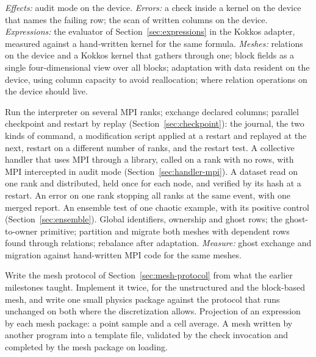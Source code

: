 \documentclass[11pt,a4paper]{article}
\begin{document}
\begin{description}[style=nextline,leftmargin=2em]
        \emph{Effects:} audit mode on the device.
        \emph{Errors:} a check inside a kernel on the device that names
        the failing row; the scan of written columns on the device.
        \emph{Expressions:} the evaluator of
        Section~\ref{sec:expressions} in the Kokkos adapter, measured
        against a hand-written kernel for the same formula.
        \emph{Meshes:} relations on the device and a Kokkos kernel that
        gathers through one; block fields as a single four-dimensional view
        over all blocks; adaptation with data resident on the device, using
        column capacity to avoid reallocation; where relation operations on
        the device should live.
  \item[M6. Distribution.]
        Run the interpreter on several MPI ranks; exchange declared columns;
        parallel checkpoint and restart by replay
        (Section~\ref{sec:checkpoint}): the journal, the two kinds of
        command, a modification script applied at a restart and replayed at
        the next, restart on a different number of ranks, and the restart
        test.  A collective handler that uses MPI through a library, called
        on a rank with no rows, with MPI intercepted in audit mode
        (Section~\ref{sec:handler-mpi}).  A dataset read on one rank and distributed, held once for
        each node, and verified by its hash at a restart.  An error on one
        rank stopping all ranks at the same event,
        with one merged report.  An ensemble test of one chaotic example,
        with its positive control (Section~\ref{sec:ensemble}).  Global identifiers, ownership and
        ghost rows; the ghost-to-owner primitive; partition and migrate both
        meshes with dependent rows found through relations; rebalance after
        adaptation.
        \emph{Measure:} ghost exchange and migration against hand-written MPI
        code for the same meshes.
  \item[M7. Mesh protocol.]
        Write the mesh protocol of Section~\ref{sec:mesh-protocol} from what
        the earlier milestones taught.  Implement it twice, for the
        unstructured and the block-based mesh, and write one small physics
        package against the protocol that runs unchanged on both where the
        discretization allows.  Projection of an expression by each mesh
        package: a point sample and a cell average.  A mesh written by
        another program into a template file, validated by the check
        invocation and completed by the mesh package on loading.
\end{description}
\end{document}
